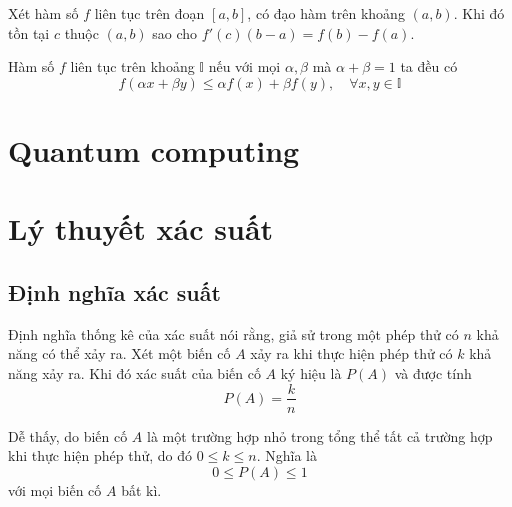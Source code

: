 \documentclass{mynotes}
\newcommand{\II}{\mathbb{I}}
\begin{document}
\begin{theorem}
    Xét hàm số $f$ liên tục trên đoạn $[a, b]$, có đạo hàm trên khoảng $(a, b)$. Khi đó tồn tại $c$ thuộc $(a, b)$ sao cho $f'(c) (b - a) = f(b) - f(a)$.
\end{theorem}

\begin{definition}
    Hàm số $f$ liên tục trên khoảng $\II$ nếu với mọi $\alpha, \beta$ mà $\alpha + \beta = 1$ ta đều có 
    \begin{equation}
        f(\alpha x + \beta y) \leqslant \alpha f(x) + \beta f(y), \quad \forall x, y \in \II
    \end{equation}
\end{definition}

\chapter{Quantum computing}



\chapter{Lý thuyết xác suất}

\section{Định nghĩa xác suất}

\begin{definition}
    Định nghĩa thống kê của xác suất nói rằng, giả sử trong một phép thử có $n$ khả năng có thể xảy ra. Xét một biến cố $A$ xảy ra khi thực hiện phép thử có $k$ khả năng xảy ra. Khi đó xác suất của biến cố $A$ ký hiệu là $P(A)$ và được tính \[P(A) = \frac{k}{n}\]
\end{definition}

Dễ thấy, do biến cố $A$ là một trường hợp nhỏ trong tổng thể tất cả trường hợp khi thực hiện phép thử, do đó $0 \leq k \leq n$. Nghĩa là \[0 \leq P(A) \leq 1\] với mọi biến cố $A$ bất kì.
\end{document}
